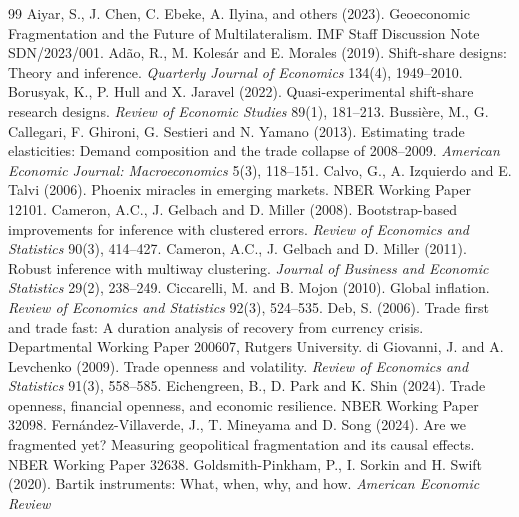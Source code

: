\documentclass[12pt, a4paper]{article}
\begin{document}
\begin{thebibliography}{99}
 Aiyar, S., J. Chen, C. Ebeke, A. Ilyina, and others (2023).
Geoeconomic Fragmentation and the Future of Multilateralism. IMF Staff Discussion Note SDN/2023/001.
 Ad\~ao, R., M. Koles\'ar and E. Morales (2019).
Shift-share designs: Theory and inference. \textit{Quarterly Journal of Economics} 134(4), 1949--2010.
 Borusyak, K., P. Hull and X. Jaravel (2022).  
Quasi-experimental shift-share research designs. \textit{Review of Economic Studies} 89(1), 181--213.  
 Bussi\`ere, M., G. Callegari, F. Ghironi, G. Sestieri and N. Yamano (2013).
Estimating trade elasticities: Demand composition and the trade collapse of 2008--2009. \textit{American Economic Journal: Macroeconomics} 5(3), 118--151.
 Calvo, G., A. Izquierdo and E. Talvi (2006). Phoenix
miracles in emerging markets. NBER Working Paper 12101.
 Cameron, A.C., J. Gelbach and D. Miller (2008).
Bootstrap-based improvements for inference with clustered errors. \textit{Review of Economics
and Statistics} 90(3), 414--427.
 Cameron, A.C., J. Gelbach and D. Miller (2011).
Robust inference with multiway clustering. \textit{Journal of Business and Economic Statistics}
29(2), 238--249.
 Ciccarelli, M. and B. Mojon (2010). Global
inflation. \textit{Review of Economics and Statistics} 92(3), 524--535.
 Deb, S. (2006). Trade first and trade fast: A duration analysis of
recovery from currency crisis. Departmental Working Paper 200607, Rutgers University.
 di Giovanni, J. and A. Levchenko (2009).
Trade openness and volatility. \textit{Review of Economics and Statistics} 91(3), 558--585.
 Eichengreen, B., D. Park and K. Shin (2024).
Trade openness, financial openness, and economic resilience. NBER Working Paper 32098.
 Fern\'andez-Villaverde, J., T. Mineyama
and D. Song (2024). Are we fragmented yet? Measuring geopolitical fragmentation and its causal
effects. NBER Working Paper 32638.
 Goldsmith-Pinkham, P., I. Sorkin and
H. Swift (2020). Bartik instruments: What, when, why, and how. \textit{American Economic Review}

\end{thebibliography}
\end{document}
